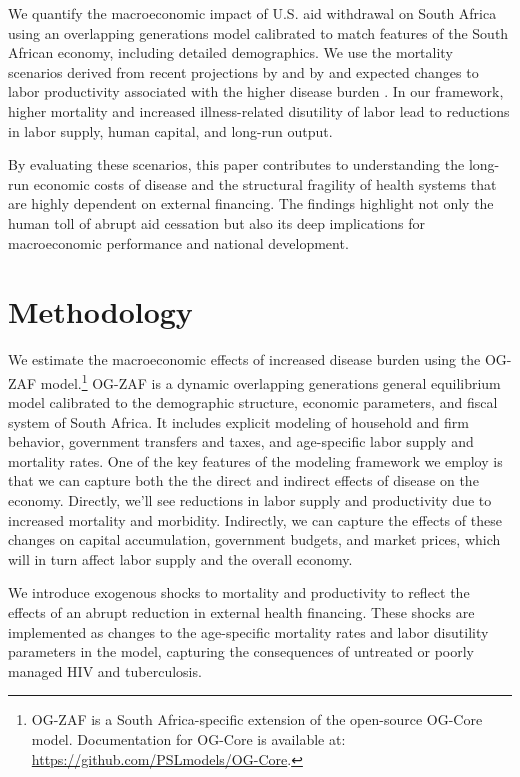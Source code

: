 \documentclass[letterpaper,12pt]{article}
\theoremstyle{definition}
\begin{document}
\begin{spacing}{1.5}
We quantify the macroeconomic impact of U.S. aid withdrawal on South Africa using an overlapping generations model calibrated to match features of the South African economy, including detailed demographics. We use the mortality scenarios derived from recent projections by \citet{KS2025} and by \citet{Gandhi2025} and expected changes to labor productivity associated with the higher disease burden \citep{Keogh2024,Panda2024}. In our framework, higher mortality and increased illness-related disutility of labor lead to reductions in labor supply, human capital, and long-run output.

By evaluating these scenarios, this paper contributes to understanding the long-run economic costs of disease and the structural fragility of health systems that are highly dependent on external financing. The findings highlight not only the human toll of abrupt aid cessation but also its deep implications for macroeconomic performance and national development.




\section{Methodology}\label{SecMethod}


We estimate the macroeconomic effects of increased disease burden using the OG-ZAF model.\footnote{OG-ZAF is a South Africa-specific extension of the open-source OG-Core model. Documentation for OG-Core is available at: \url{https://github.com/PSLmodels/OG-Core}.} OG-ZAF is a dynamic overlapping generations general equilibrium model calibrated to the demographic structure, economic parameters, and fiscal system of South Africa. It includes explicit modeling of household and firm behavior, government transfers and taxes, and age-specific labor supply and mortality rates.  One of the key features of the modeling framework we employ is that we can capture both the the direct and indirect effects of disease on the economy. Directly, we'll see reductions in labor supply and productivity due to increased mortality and morbidity. Indirectly, we can capture the effects of these changes on capital accumulation, government budgets, and market prices, which will in turn affect labor supply and the overall economy.

We introduce exogenous shocks to mortality and productivity to reflect the effects of an abrupt reduction in external health financing. These shocks are implemented as changes to the age-specific mortality rates and labor disutility parameters in the model, capturing the consequences of untreated or poorly managed HIV and tuberculosis.


\end{spacing}
\end{document}
